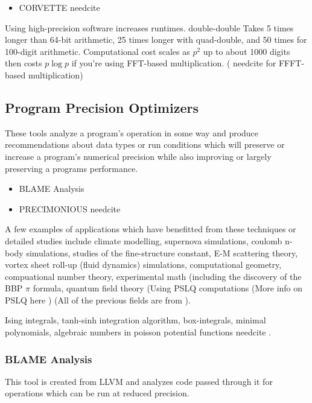 \documentclass{article}
\newcommand{\needcite}{
	\gls{needcite}
}
\begin{document}
\begin{itemize}
\item CORVETTE \needcite
\end{itemize}

Using high-precision software increases runtimes. double-double Takes 5 times longer than 64-bit arithmetic, 25 times longer with quad-double, and 50 times for 100-digit arithmetic. Computational cost scales as $p^2$ up to about 1000 digits then costs $p\log p$ if you're using FFT-based multiplication. \cite{high-precision-arith-in-science} (\needcite for FFFT-based multiplication)

\subsection{Program Precision Optimizers}

These tools analyze a program's operation in some way and produce recommendations about data types or run conditions which will preserve or increase a program's numerical precision while also improving or largely preserving a programs performance.

\begin{itemize}
\item BLAME Analysis \cite{blame-analysis}
\item PRECIMONIOUS \needcite
\end{itemize}

A few examples of applications which have benefitted from these techniques or detailed studies include climate modelling, supernova simulations, coulomb n-body simulations, studies of the fine-structure constant, E-M scattering theory, vortex sheet roll-up (fluid dynamics) simulations, computational geometry, compuational number theory, experimental math (including the discovery of the BBP $\pi$ formula, quantum field theory (Using PSLQ computations (More info on PSLQ here \cite{dhb-numerical-bugs}) (All of the previous fields are from \cite{high-precision-arith-in-science}).

Ising integrals, tanh-sinh integration algorithm, box-integrals, minimal polynomials, algebraic numbers in poisson potential functions \needcite \cite{dhb-zurich-hp}.

\subsubsection{BLAME Analysis}

This tool is created from LLVM and analyzes code passed through it for operations which can be run at reduced precision. \cite{blame-analysis}
\end{document}
